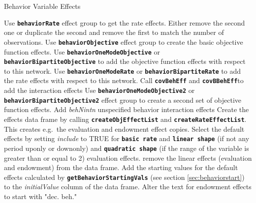 \documentclass[12pt,a4paper]{article}
\makeatletter
\renewcommand{\=}{\,=\,}
\newcommand{\+}{\,+\,}
\newcommand{\nnm}[1]{\textsf{\textit{#1}}}
\renewcommand{\subsection}{\@startsection{subsection}{2}
                {0pt}{0.7\baselineskip}{0.3\baselineskip}
                {\sffamily} }
\newcommand{\sfn}[1]{\textbf{\texttt{#1}}}
\makeatother
\begin{document}
\subsection{Behavior Variable Effects}
\begin{algorithmic}
\STATE Use \sfn{behaviorRate} effect group to get the rate effects. Either
remove the second one or duplicate the second and remove the first to match the
number of observations.
\STATE Use \sfn{behaviorObjective} effect group to create the basic objective
function effects.
\STATE Use \sfn{behaviorOneModeObjective} or \sfn{behaviorBipartiteObjective} to
add the objective function effects with respect to this network.
\STATE Use \sfn{behaviorOneModeRate} or \sfn{behaviorBipartiteRate} to add
the rate effects with respect to this network.
\ENDFOR
{}
\STATE Call \sfn{covBehEff} and \sfn{covBBehEff}to add the interaction effects
\ENDFOR
{}
\STATE Use \sfn{behaviorOneModeObjective2} or \sfn{behaviorBipartiteObjective2}
effect group to create a second set of objective function effects.
\ENDFOR
\STATE Add  \nnm{behNintn} unspecified behavior interaction effects
  \STATE Create the effects data frame by calling \sfn{createObjEffectList} and
  \sfn{createRateEffectList}.  This creates e.g.\ the evaluation and endowment
  effect copies.
  \STATE Select the default effects by setting \nnm{include} to TRUE for
  \sfn{basic rate} and \sfn{linear shape}
  (if not any period uponly or downonly)
  and \sfn{quadratic shape}
  (if the range of the variable is greater than or equal to 2)
  evaluation effects.
  \STATE remove the linear effects (evaluation and endowment)
  from the data frame.
  \ENDIF
  \STATE Add the starting values for the default effects calculated by
  \sfn{getBehaviorStartingVals}  (see section \ref{sec:behaviorstart})
 to the \nnm{initialValue} column of the data
  frame.
\STATE Alter the text for endowment effects to start with "dec. beh."
\end{algorithmic}
\end{document}
